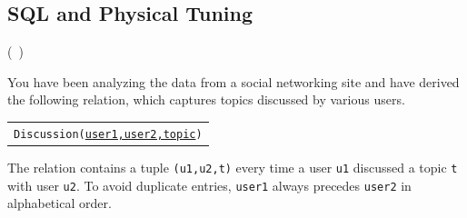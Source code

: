 \documentclass[addpoints,answers,12pt]{exam}
\newcommand{\eat}[1]{}
\begin{document}
\begin{questions}
\section{SQL and Physical Tuning}

\question (\totalpoints\ \points) 

You have been analyzing the data from a social
networking site and have derived the following relation,
which captures topics discussed by various users.

\begin{tabular}{l}
  \texttt{Discussion(\underline{user1,user2,topic})} \\
\end{tabular}

\eat{
drop table Discussion
create table Discussion(user1 varchar(50), user2 varchar(50), topic varchar(50))

insert into Discussion values ('Alice','Bob','TopicAlicBob1')
insert into Discussion values ('Alice','Bob','TopicAlicBob2')
insert into Discussion values ('Alice','Bob','TopicAlicBob3')
insert into Discussion values ('Alice','Chuck','TopicAlicChuck1')
insert into Discussion values ('Alice','Chuck','TopicAlicChuck2')
insert into Discussion values ('Bob','Chuck','TopicBobChuck1')
insert into Discussion values ('Alice','Chuck','TopicAlicBob1')
}

The relation contains a tuple \texttt{(u1,u2,t)} every time a user
\texttt{u1} discussed a topic \texttt{t} with user \texttt{u2}. To
avoid duplicate entries, \texttt{user1} always precedes \texttt{user2}
in alphabetical order.

\end{questions}
\end{document}
